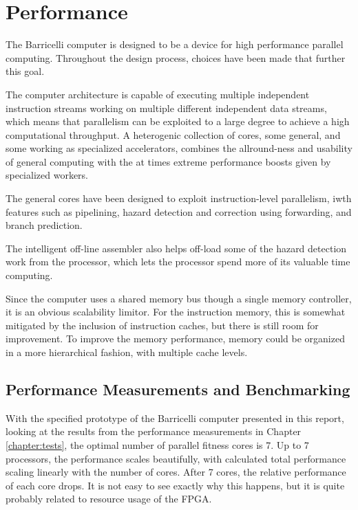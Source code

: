 \section{Performance}

The Barricelli computer is designed to be a device for high performance parallel computing.
Throughout the design process, choices have been made that further this goal.

The computer architecture is capable of executing multiple independent instruction streams working on multiple different independent data streams, which means that parallelism can be exploited to a large degree to achieve a high computational throughput.
A heterogenic collection of cores, some general, and some working as specialized accelerators, combines the allround-ness and usability of general computing with the at times extreme performance boosts given by specialized workers.

The general cores have been designed to exploit instruction-level parallelism, iwth features such as pipelining, hazard detection and correction using forwarding, and branch prediction.

The intelligent off-line assembler also helps off-load some of the hazard detection work from the processor, which lets the processor spend more of its valuable time computing.

Since the computer uses a shared memory bus though a single memory controller, it is an obvious scalability limitor.
For the instruction memory, this is somewhat mitigated by the inclusion of instruction caches, but there is still room for improvement.
To improve the memory performance, memory could be organized in a more hierarchical fashion, with multiple cache levels.

\subsection{Performance Measurements and Benchmarking}

With the specified prototype of the Barricelli computer presented in this report, looking at the results from the performance measurements in Chapter \vref{chapter:tests}, the optimal number of parallel fitness cores is 7.
Up to 7 processors, the performance scales beautifully, with calculated total performance scaling linearly with the number of cores.
After 7 cores, the relative performance of each core drops.
It is not easy to see exactly why this happens, but it is quite probably related to resource usage of the FPGA.

